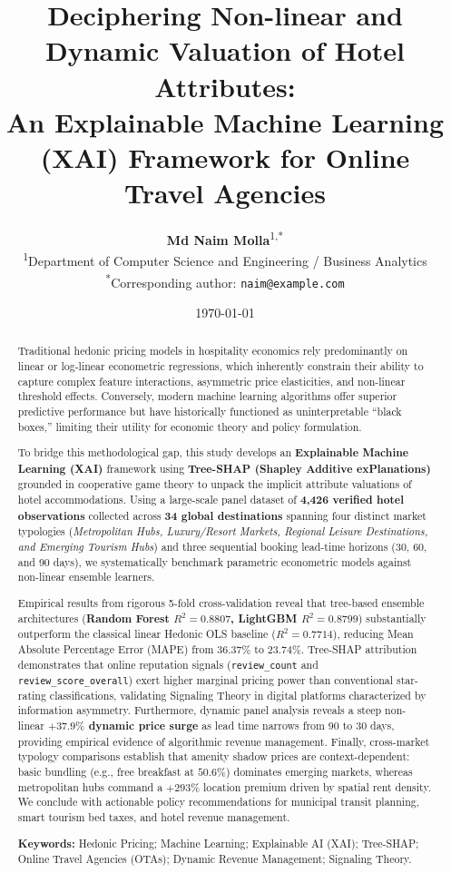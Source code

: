 \documentclass[11pt,a4paper]{article}
\title{\textbf{\Large Deciphering Non-linear and Dynamic Valuation of Hotel Attributes: \\ An Explainable Machine Learning (XAI) Framework for Online Travel Agencies}}
\author{
    \textbf{Md Naim Molla}\textsuperscript{1,*} \\[0.5em]
    \small \textsuperscript{1}Department of Computer Science and Engineering / Business Analytics \\
    \small \textsuperscript{*}Corresponding author: \texttt{naim@example.com}
}
\date{\today}
\begin{document}
\maketitle

\begin{abstract}
\noindent Traditional hedonic pricing models in hospitality economics rely predominantly on linear or log-linear econometric regressions, which inherently constrain their ability to capture complex feature interactions, asymmetric price elasticities, and non-linear threshold effects. Conversely, modern machine learning algorithms offer superior predictive performance but have historically functioned as uninterpretable ``black boxes,'' limiting their utility for economic theory and policy formulation. 

To bridge this methodological gap, this study develops an \textbf{Explainable Machine Learning (XAI)} framework using \textbf{Tree-SHAP (Shapley Additive exPlanations)} grounded in cooperative game theory to unpack the implicit attribute valuations of hotel accommodations. Using a large-scale panel dataset of \textbf{4,426 verified hotel observations} collected across \textbf{34 global destinations} spanning four distinct market typologies (\textit{Metropolitan Hubs, Luxury/Resort Markets, Regional Leisure Destinations, and Emerging Tourism Hubs}) and three sequential booking lead-time horizons (30, 60, and 90 days), we systematically benchmark parametric econometric models against non-linear ensemble learners.

Empirical results from rigorous 5-fold cross-validation reveal that tree-based ensemble architectures (\textbf{Random Forest $R^2 = 0.8807$, LightGBM $R^2 = 0.8799$}) substantially outperform the classical linear Hedonic OLS baseline ($R^2 = 0.7714$), reducing Mean Absolute Percentage Error (MAPE) from $36.37\%$ to $23.74\%$. Tree-SHAP attribution demonstrates that online reputation signals (\texttt{review\_count} and \texttt{review\_score\_overall}) exert higher marginal pricing power than conventional star-rating classifications, validating Signaling Theory in digital platforms characterized by information asymmetry. Furthermore, dynamic panel analysis reveals a steep non-linear \textbf{$+37.9\%$ dynamic price surge} as lead time narrows from 90 to 30 days, providing empirical evidence of algorithmic revenue management. Finally, cross-market typology comparisons establish that amenity shadow prices are context-dependent: basic bundling (e.g., free breakfast at $50.6\%$) dominates emerging markets, whereas metropolitan hubs command a $+293\%$ location premium driven by spatial rent density. We conclude with actionable policy recommendations for municipal transit planning, smart tourism bed taxes, and hotel revenue management.

\vspace{0.8em}
\noindent \textbf{Keywords:} Hedonic Pricing; Machine Learning; Explainable AI (XAI); Tree-SHAP; Online Travel Agencies (OTAs); Dynamic Revenue Management; Signaling Theory.
\end{abstract}
\end{document}

